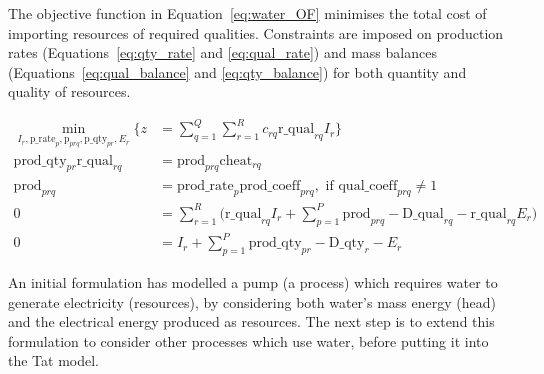 The objective function in Equation~\eqref{eq:water_OF} minimises the total cost of importing resources of required qualities. Constraints are imposed on production rates (Equations~\eqref{eq:qty_rate} and \eqref{eq:qual_rate}) and mass balances (Equations~\eqref{eq:qual_balance} and \eqref{eq:qty_balance}) for both quantity and quality of resources.

\begin{align}
	\min_{I_r,\mbox{p\_rate}_p,\mbox{p}_{prq},\mbox{p\_qty}_{pr},E_r} \Bigg\{z&=\sum_{q=1}^Q \sum_{r=1}^R c_{rq}\mbox{r\_qual}_{rq}I_{r}\Bigg\} \label{eq:water_OF} \\
	\mbox{prod\_qty}_{pr} \mbox{r\_qual}_{rq} &= \mbox{prod}_{prq} \mbox{cheat}_{rq} \label{eq:qty_rate} \\ 
	\mbox{prod}_{prq} &= \mbox{prod\_rate}_{p} \mbox{prod\_coeff}_{prq}, \mbox{    if } \mbox{qual\_coeff}_{prq} \neq 1 \label{eq:qual_rate} \\
	0 &= \sum_{r=1}^R \Bigg(\mbox{r\_qual}_{rq} I_r + \sum_{p=1}^P \mbox{prod}_{prq} - \mbox{D\_qual}_{rq} - \mbox{r\_qual}_{rq} E_r \Bigg) \label{eq:qual_balance} \\
	0 &= I_r + \sum_{p=1}^P\mbox{prod\_qty}_{pr} - \mbox{D\_qty}_{r}-E_r \label{eq:qty_balance} 
\end{align}

An initial formulation has modelled a pump (a process) which requires water to generate electricity (resources), by considering both water's mass energy (head) and the electrical energy produced as resources. The next step is to extend this formulation to consider other processes which use water, before putting it into the Tat model.
